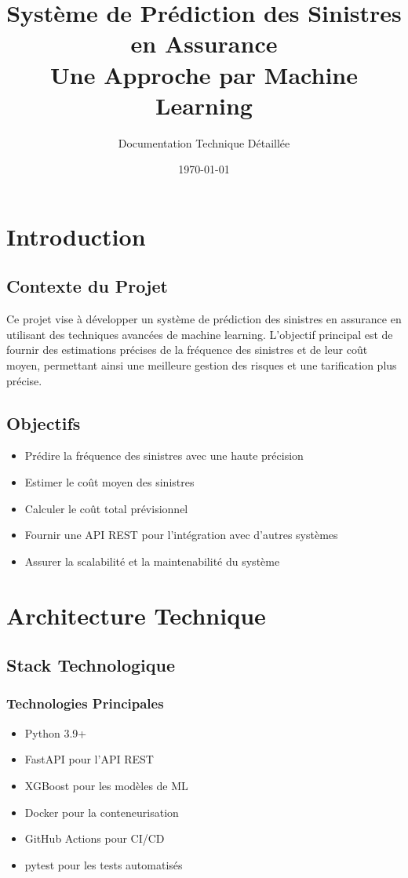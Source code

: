 \documentclass[12pt,a4paper]{report}
\title{Système de Prédiction des Sinistres en Assurance\\
\large Une Approche par Machine Learning}
\author{Documentation Technique Détaillée}
\date{\today}
\begin{document}
\maketitle
\tableofcontents

\chapter{Introduction}
\section{Contexte du Projet}
Ce projet vise à développer un système de prédiction des sinistres en assurance en utilisant des techniques avancées de machine learning. L'objectif principal est de fournir des estimations précises de la fréquence des sinistres et de leur coût moyen, permettant ainsi une meilleure gestion des risques et une tarification plus précise.

\section{Objectifs}
\begin{itemize}
    \item Prédire la fréquence des sinistres avec une haute précision
    \item Estimer le coût moyen des sinistres
    \item Calculer le coût total prévisionnel
    \item Fournir une API REST pour l'intégration avec d'autres systèmes
    \item Assurer la scalabilité et la maintenabilité du système
\end{itemize}

\chapter{Architecture Technique}
\section{Stack Technologique}
\subsection{Technologies Principales}
\begin{itemize}
    \item Python 3.9+
    \item FastAPI pour l'API REST
    \item XGBoost pour les modèles de ML
    \item Docker pour la conteneurisation
    \item GitHub Actions pour CI/CD
    \item pytest pour les tests automatisés
\end{itemize}
\end{document}
